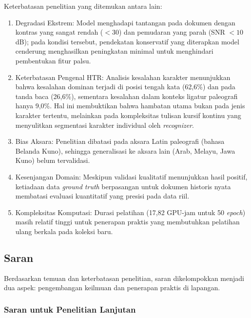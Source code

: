 \documentclass[12pt,a4paper]{article}
\begin{document}
Keterbatasan penelitian yang ditemukan antara lain:
\begin{enumerate}[leftmargin=1.5em, labelsep=0.5em, itemindent=0pt, noitemsep, topsep=0pt, partopsep=0pt]
  \item Degradasi Ekstrem: Model menghadapi tantangan pada dokumen dengan kontras yang sangat rendah ($<30$) dan pemudaran yang parah (SNR $< 10$ dB); pada kondisi tersebut, pendekatan konservatif yang diterapkan model cenderung menghasilkan peningkatan minimal untuk menghindari pembentukan fitur palsu.
  \item Keterbatasan Pengenal HTR: Analisis kesalahan karakter menunjukkan bahwa kesalahan dominan terjadi di posisi tengah kata (62,6\%) dan pada tanda baca (26,6\%), sementara kesalahan dalam konteks ligatur paleografi hanya 9,0\%. Hal ini membuktikan bahwa hambatan utama bukan pada jenis karakter tertentu, melainkan pada kompleksitas tulisan kursif kontinu yang menyulitkan segmentasi karakter individual oleh \textit{recognizer}.
  \item Bias Aksara: Penelitian dibatasi pada aksara Latin paleografi (bahasa Belanda Kuno), sehingga generalisasi ke aksara lain (Arab, Melayu, Jawa Kuno) belum tervalidasi.
  \item Kesenjangan Domain: Meskipun validasi kualitatif menunjukkan hasil positif, ketiadaan data \textit{ground truth} berpasangan untuk dokumen historis nyata membatasi evaluasi kuantitatif yang presisi pada data riil.
  \item Kompleksitas Komputasi: Durasi pelatihan (17,82 GPU-jam untuk 50 \textit{epoch}) masih relatif tinggi untuk penerapan praktis yang membutuhkan pelatihan ulang berkala pada koleksi baru.
\end{enumerate}

\subsection{Saran}
\label{subsec:saran}


Berdasarkan temuan dan keterbatasan penelitian, saran dikelompokkan menjadi dua aspek: pengembangan keilmuan dan penerapan praktis di lapangan.

\subsubsection{Saran untuk Penelitian Lanjutan}
\label{subsubsec:saran-penelitian}
\end{document}

